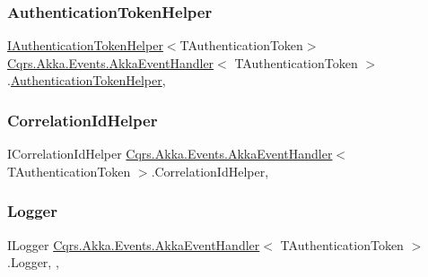 \subsubsection{\texorpdfstring{Authentication\+Token\+Helper}{AuthenticationTokenHelper}}
{\footnotesize\ttfamily \hyperlink{interfaceCqrs_1_1Authentication_1_1IAuthenticationTokenHelper}{I\+Authentication\+Token\+Helper}$<$T\+Authentication\+Token$>$ \hyperlink{classCqrs_1_1Akka_1_1Events_1_1AkkaEventHandler}{Cqrs.\+Akka.\+Events.\+Akka\+Event\+Handler}$<$ T\+Authentication\+Token $>$.\hyperlink{classCqrs_1_1Authentication_1_1AuthenticationTokenHelper}{Authentication\+Token\+Helper}\hspace{0.3cm}{\ttfamily [get]}, {\ttfamily [protected]}}

\mbox{\label{classCqrs_1_1Akka_1_1Events_1_1AkkaEventHandler_a711ada6cc5e9fea454983378f6d5f109_a711ada6cc5e9fea454983378f6d5f109}} 
\subsubsection{\texorpdfstring{Correlation\+Id\+Helper}{CorrelationIdHelper}}
{\footnotesize\ttfamily I\+Correlation\+Id\+Helper \hyperlink{classCqrs_1_1Akka_1_1Events_1_1AkkaEventHandler}{Cqrs.\+Akka.\+Events.\+Akka\+Event\+Handler}$<$ T\+Authentication\+Token $>$.Correlation\+Id\+Helper\hspace{0.3cm}{\ttfamily [get]}, {\ttfamily [protected]}}

\mbox{\label{classCqrs_1_1Akka_1_1Events_1_1AkkaEventHandler_af9ccf9b06321f7cbb21934e83005346e_af9ccf9b06321f7cbb21934e83005346e}} 
\subsubsection{\texorpdfstring{Logger}{Logger}}
{\footnotesize\ttfamily I\+Logger \hyperlink{classCqrs_1_1Akka_1_1Events_1_1AkkaEventHandler}{Cqrs.\+Akka.\+Events.\+Akka\+Event\+Handler}$<$ T\+Authentication\+Token $>$.Logger\hspace{0.3cm}{\ttfamily [get]}, {\ttfamily [set]}, {\ttfamily [protected]}}

